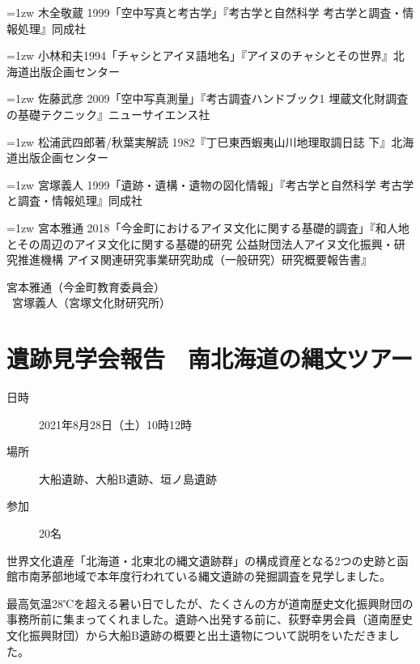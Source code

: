 \documentclass[a4j,11pt,twocolumn,openany]{jsbook}
\begin{document}
{\small 
\hangindent=1zw
\noindent
木全敬蔵 1999「空中写真と考古学」『考古学と自然科学 考古学と調査・情報処理』同成社

\hangindent=1zw
\noindent
小林和夫1994「チャシとアイヌ語地名」『アイヌのチャシとその世界』北海道出版企画センター

\hangindent=1zw
\noindent
佐藤武彦 2009「空中写真測量」『考古調査ハンドブック1 埋蔵文化財調査の基礎テクニック』ニューサイエンス社

\hangindent=1zw
\noindent
松浦武四郎著/秋葉実解読 1982『丁巳東西蝦夷山川地理取調日誌 下』北海道出版企画センター

\hangindent=1zw
\noindent
宮塚義人 1999「遺跡・遺構・遺物の図化情報」『考古学と自然科学 考古学と調査・情報処理』同成社

\hangindent=1zw
\noindent
宮本雅通 2018「今金町におけるアイヌ文化に関する基礎的調査」『和人地とその周辺のアイヌ文化に関する基礎的研究 公益財団法人アイヌ文化振興・研究推進機構 アイヌ関連研究事業研究助成（一般研究）研究概要報告書』

}

\begin{flushright}
	宮本雅通（今金町教育委員会）\\\
	宮塚義人（宮塚文化財研究所）
\end{flushright}


\chapter{遺跡見学会報告　南北海道の縄文ツアー}

\begin{description}
	\item [日時] 2021年8月28日（土）10時12時
	\item [場所] 大船遺跡、大船B遺跡、垣ノ島遺跡
	\item [参加] 20名
\end{description}

世界文化遺産「北海道・北東北の縄文遺跡群」の構成資産となる2つの史跡と函館市南茅部地域で本年度行われている縄文遺跡の発掘調査を見学しました。

最高気温28℃を超える暑い日でしたが、たくさんの方が道南歴史文化振興財団の事務所前に集まってくれました。遺跡へ出発する前に、荻野幸男会員（道南歴史文化振興財団）から大船B遺跡の概要と出土遺物について説明をいただきました。
\end{document}
